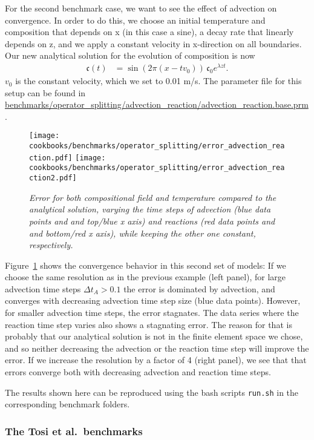 \documentclass{article}
\begin{document}
For the second benchmark case, we want to see the effect of advection on convergence. 
In order to do this, we choose an initial temperature and composition that depends on x (in this case a sine), a decay rate that linearly depends on z, and we apply a constant velocity in x-direction on all boundaries. Our new analytical solution for the evolution of composition is now
 \begin{align}
  \mathfrak{c}(t) 
  &=
  \sin (2\pi(x-t v_0)) \, \mathfrak{c}_0 e^{\lambda z t}.
\end{align}
$v_0$ is the constant velocity, which we set to 0.01 m/s. 
The parameter file for this setup can be found in \url{benchmarks/operator_splitting/advection_reaction/advection_reaction.base.prm}. 
\begin{figure}
  \begin{center}
    \texttt{[image: cookbooks/benchmarks/operator\_splitting/error\_advection\_reaction.pdf]}
    \texttt{[image: cookbooks/benchmarks/operator\_splitting/error\_advection\_reaction2.pdf]}
  \end{center}
  \caption{\it Error for both compositional field and temperature compared to the analytical solution, varying the time steps of advection (blue data points and and top/blue x axis) and reactions (red data points and and bottom/red x axis), while keeping the other one constant, respectively.}
  \label{fig:advection-reaction}
\end{figure}
Figure~\ref{fig:advection-reaction} shows the convergence behavior in this second set of models: 
If we choose the same resolution as in the previous example (left panel), for large advection time steps $\Delta t_A > 0.1$ the error is dominated by advection, and converges with decreasing advection time step size (blue data points). However, for smaller advection time steps, the error stagnates. The data series where the reaction time step varies also shows a stagnating error. The reason for that is probably that our analytical solution is not in the finite element space we chose, and so neither decreasing the advection or the reaction time step will improve the error. 
If we increase the resolution by a factor of 4 (right panel), we see that that errors converge both with decreasing advection and reaction time steps.  

The results shown here can be reproduced using the bash scripts \texttt{run.sh} in the corresponding benchmark folders. 

\subsubsection{The Tosi et al.~benchmarks}
\label{sec:benchmark-tosii}
\end{document}
